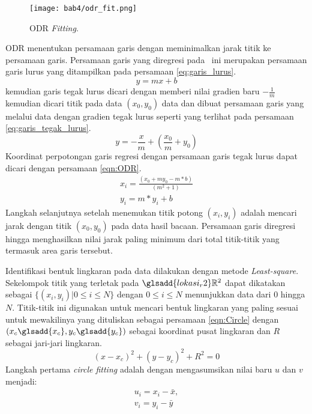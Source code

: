 \begin{figure}[H]
    \centering
    \texttt{[image: bab4/odr\_fit.png]}
    \caption{ODR \textit{Fitting}.}
    \label{fig:Ch04_odr}
\end{figure}
ODR menentukan persamaan garis dengan meminimalkan jarak titik ke persamaan garis. Persamaan garis yang diregresi pada \capstone\ ini merupakan persamaan garis lurus yang ditampilkan pada persamaan \ref{eq:garis_lurus}.
\begin{equation}
    \label{eq:garis_lurus}
    y=mx+b
\end{equation}
kemudian garis tegak lurus dicari dengan memberi nilai gradien baru $-\frac{1}{m}$ kemudian dicari titik pada data $(x_0,y_0)$ data dan dibuat persamaan garis yang melalui data dengan gradien tegak lurus seperti yang terlihat pada persamaan \ref{eq:garis_tegak_lurus}.
\begin{equation}
    \label{eq:garis_tegak_lurus}
    y=-\frac{x}{m}+(\frac{x_0}{m}+y_0)
\end{equation}
Koordinat perpotongan garis regresi dengan persamaan garis tegak lurus dapat dicari dengan persamaan \ref*{eqn:ODR}.
\begin{equation}
    \label{eqn:ODR}
    \begin{gathered}
        x_i = \frac{(x_0 + my_0 - m*b)}{(m^2 + 1)}\\
        y_i = m*y_i + b       
    \end{gathered}
\end{equation}
Langkah selanjutnya setelah menemukan titik potong $(x_i,y_i)$ adalah mencari jarak dengan titik $(x_0,y_0)$ pada data hasil bacaan. Persamaan garis diregresi hingga menghasilkan nilai jarak paling minimum dari total titik-titik yang termasuk area garis tersebut.


Identifikasi bentuk lingkaran pada data dilakukan dengan metode \textit{Least-square}\cite{d2}. %
Sekelompok titik yang terletak pada $\glsadd{lokasi_r2}\mathbb{R}^2$ dapat dikatakan sebagai  $ \{(x_i,y_i)|0 \leq i \leq N\}$ dengan
$0\leq i \leq N$ menunjukkan data dari 0 hingga $N$. Titik-titik ini digunakan untuk mencari bentuk lingkaran yang paling sesuai untuk mewakilinya yang dituliskan sebagai persamaan \ref*{eqn:Circle} dengan $(x_c\glsadd{x_c},y_c\glsadd{y_c})$ sebagai koordinat pusat lingkaran dan $R$ sebagai jari-jari lingkaran. 
\begin{equation}
    \label{eqn:Circle}
    (x-x_c)^2+(y-y_c)^2+R^2=0
\end{equation}
Langkah pertama \textit{circle fitting} adalah dengan mengasumsikan nilai baru $u$ dan $v$ menjadi:
\begin{equation}
    \begin{gathered}
        u_i=x_i-\bar{x}, \\ 
        v_i=y_i-\bar{y}
        \label{eqn:asumsi_uv}
    \end{gathered} 
\end{equation}

